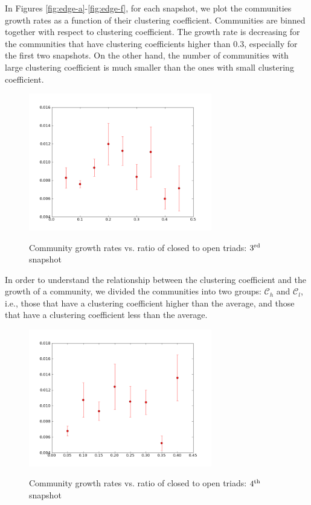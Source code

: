 In Figures \ref{fig:edge-a}-\ref{fig:edge-f}, for each snapshot, we plot the communities growth rates  as a function of their clustering coefficient.  Communities are binned together with respect to clustering coefficient. The growth rate is  decreasing for the communities that have clustering coefficients  higher than $0.3$, especially for the first two snapshots.  On the other hand, the number of communities  with large clustering coefficient  is much smaller than the ones with small clustering coefficient.

\begin{figure}
  \begin{center}
    \includegraphics[width=8cm]{third.png}\label{fig:edge-c}
    \caption{Community growth rates vs. ratio of closed to open triads: $3^{\rm rd}$ snapshot}
    \end{center}
\end{figure}




In order to understand the relationship between  the clustering coefficient and the growth of a community, we divided 
the communities into two groups: $\mathcal{C}_h$ and $\mathcal{C}_l$, i.e., those that have  a clustering coefficient higher than the average, and those that have a  clustering coefficient less than the average. 

\begin{figure}
  \begin{center}
    \includegraphics[width=8cm]{fourth.png}\label{fig:edge-d}
    \caption{Community growth rates vs. ratio of closed to open triads: $4^{\rm th}$ snapshot}
    \end{center}
\end{figure}




